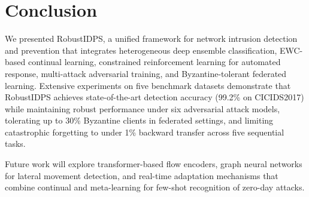 \section{Conclusion}
\label{sec:conclusion}

We presented RobustIDPS, a unified framework for network intrusion detection and prevention that integrates heterogeneous deep ensemble classification, EWC-based continual learning, constrained reinforcement learning for automated response, multi-attack adversarial training, and Byzantine-tolerant federated learning. Extensive experiments on five benchmark datasets demonstrate that RobustIDPS achieves state-of-the-art detection accuracy (99.2\% on CICIDS2017) while maintaining robust performance under six adversarial attack models, tolerating up to 30\% Byzantine clients in federated settings, and limiting catastrophic forgetting to under 1\% backward transfer across five sequential tasks.

Future work will explore transformer-based flow encoders, graph neural networks for lateral movement detection, and real-time adaptation mechanisms that combine continual and meta-learning for few-shot recognition of zero-day attacks.

\balance

